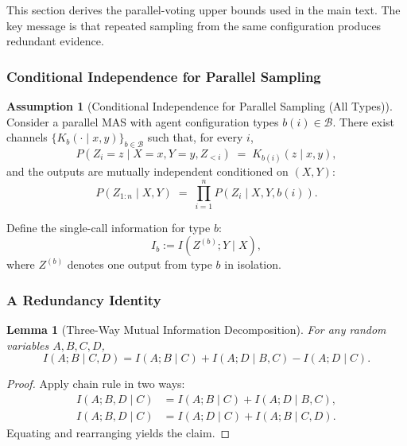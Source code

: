 \documentclass{article}
\theoremstyle{plain}
\newtheorem{lemma}[theorem]{Lemma}
\theoremstyle{definition}
\newtheorem{assumption}[theorem]{Assumption}
\theoremstyle{remark}
\begin{document}
This section derives the parallel-voting upper bounds used in the main text.
The key message is that repeated sampling from the same configuration produces redundant evidence.

\subsubsection{Conditional Independence for Parallel Sampling}
\label{app:parallel-ci}

\begin{assumption}[Conditional Independence for Parallel Sampling (All Types)]
\label{assump:parallel-ci}
Consider a parallel MAS with agent configuration types $b(i)\in\mathcal{B}$.
There exist channels $\{K_b(\cdot\mid x,y)\}_{b\in\mathcal{B}}$ such that, for every $i$,
\begin{equation}
P(Z_i=z\mid X=x,Y=y, Z_{<i}) \;=\; K_{b(i)}(z\mid x,y),
\end{equation}
and the outputs are mutually independent conditioned on $(X,Y)$:
\begin{equation}
P(Z_{1:n}\mid X,Y) \;=\; \prod_{i=1}^n P(Z_i\mid X,Y, b(i)).
\end{equation}
\end{assumption}

Define the single-call information for type $b$:
\begin{equation}
I_b := I(Z^{(b)};Y\mid X),
\label{eq:Ib_def}
\end{equation}
where $Z^{(b)}$ denotes one output from type $b$ in isolation.

\subsubsection{A Redundancy Identity}
\label{app:parallel-identity}

\begin{lemma}[Three-Way Mutual Information Decomposition]
\label{lem:three-way}
For any random variables $A,B,C,D$,
\begin{equation}
I(A;B\mid C,D)
= I(A;B\mid C) + I(A;D\mid B,C) - I(A;D\mid C).
\end{equation}
\end{lemma}

\begin{proof}
Apply chain rule in two ways:
\begin{align}
I(A;B,D\mid C) &= I(A;B\mid C) + I(A;D\mid B,C), \\
I(A;B,D\mid C) &= I(A;D\mid C) + I(A;B\mid C,D).
\end{align}
Equating and rearranging yields the claim.
\end{proof}
\end{document}
